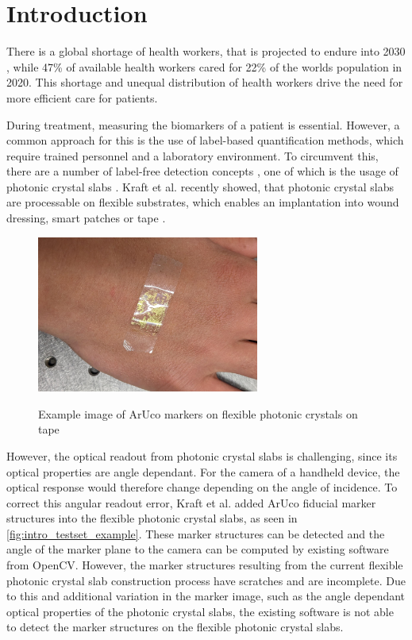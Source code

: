 \documentclass[10pt]{book}
\begin{document}
\tableofcontents
\listoffigures
\mainmatter
\chapter{Introduction}

There is a global shortage of health workers, that is projected to endure into 2030 \cite{BMJHealthWorkforce22}, while 47\% of available health workers cared for 22\% of the worlds population in 2020. This shortage and unequal distribution of health workers drive the need for more efficient care for patients. 

During treatment, measuring the biomarkers of a patient is essential. However, a common approach for this is the use of label-based quantification methods, which require trained personnel and a laboratory environment. To circumvent this, there are a number of label-free detection concepts \cite{rapp2010biosensors}, one of which is the usage of photonic crystal slabs \cite{Pitruzzello_2018}. Kraft et al. recently showed, that photonic crystal slabs are processable on flexible substrates, which enables an implantation into wound dressing, smart patches or tape \cite{Fab23}.

\begin{figure}
  \caption{Example image of \ac{ArUco} markers on flexible photonic crystals on tape}
  \includegraphics[width=0.65\textwidth]{image/testset_example_crop}
  \label{fig:intro_testset_example}
\end{figure}

However, the optical readout from photonic crystal slabs is challenging, since its optical properties are angle dependant. For the camera of a handheld device, the optical response would therefore change depending on the angle of incidence. To correct this angular readout error, Kraft et al. added \ac{ArUco} fiducial marker structures into the flexible photonic crystal slabs, as seen in \autoref{fig:intro_testset_example}. These marker structures can be detected and the angle of the marker plane to the camera can be computed by existing software from \ac{OpenCV}. However, the marker structures resulting from the current flexible photonic crystal slab construction process have scratches and are incomplete. Due to this and additional variation in the marker image, such as the angle dependant optical properties of the photonic crystal slabs, the existing software is not able to detect the marker structures on the flexible photonic crystal slabs.
\end{document}
